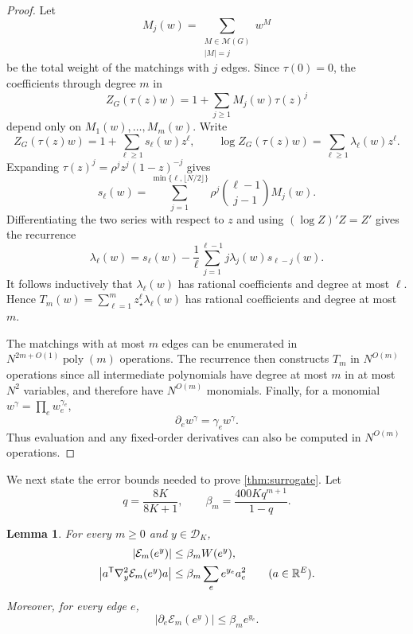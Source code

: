 \documentclass[11pt,reqno,letterpaper]{amsart}
\numberwithin{equation}{section}
\newtheorem{lemma}[lemma]{Lemma}
\theoremstyle{definition}
\theoremstyle{remark}
\newcommand{\R}{\mathbb R}
\newcommand{\cM}{\mathcal M}
\newcommand{\cD}{\mathcal D}
\begin{document}
\begin{proof}
Let
\[
 M_j(w)=\sum_{\substack{M\in\cM(G)\\|M|=j}}w^M
\]
be the total weight of the matchings with $j$ edges. Since $\tau(0)=0$,
the coefficients through degree $m$ in
\[
 Z_G(\tau(z)w)=1+\sum_{j\ge1}M_j(w)\tau(z)^j
\]
depend only on $M_1(w),\ldots,M_m(w)$. Write
\[
 Z_G(\tau(z)w)=1+\sum_{\ell\ge1}s_\ell(w)z^\ell,
 \qquad
 \log Z_G(\tau(z)w)=\sum_{\ell\ge1}\lambda_\ell(w)z^\ell.
\]
Expanding $\tau(z)^j=\rho^jz^j(1-z)^{-j}$ gives
\[
 s_\ell(w)=
 \sum_{j=1}^{\min\{\ell,\lfloor N/2\rfloor\}}
 \rho^j\binom{\ell-1}{j-1}M_j(w).
\]
Differentiating the two series with respect to $z$ and using
$(\log Z)'Z=Z'$ gives the recurrence
\begin{equation}\label{eq:log-coefficient-recurrence}
 \lambda_\ell(w)
 =s_\ell(w)-\frac1\ell
   \sum_{j=1}^{\ell-1}j\lambda_j(w)s_{\ell-j}(w).
\end{equation}
It follows inductively that $\lambda_\ell(w)$ has rational
coefficients and degree at most $\ell$. Hence
$T_m(w)=\sum_{\ell=1}^m z_\star^\ell\lambda_\ell(w)$ has rational
coefficients and degree at most $m$.

The matchings with at most $m$ edges can be enumerated in
$N^{2m+O(1)}\operatorname{poly}(m)$ operations. The recurrence then
constructs $T_m$ in $N^{O(m)}$ operations since all intermediate
polynomials have degree at most $m$ in at most $N^2$ variables,
and therefore have $N^{O(m)}$ monomials. Finally, for a monomial
$w^\gamma=\prod_e w_e^{\gamma_e}$,
\[
 \partial_e w^\gamma=\gamma_e w^\gamma.
\]
Thus evaluation and any fixed-order derivatives can also be
computed in $N^{O(m)}$ operations.
\end{proof}

We next state the error bounds needed to prove \cref{thm:surrogate}.
Let
\begin{equation*}
 q=\frac{8K}{8K+1},\qquad
 \beta_m=\frac{400Kq^{m+1}}{1-q}.
\end{equation*}

\begin{lemma}\label{lem:taylor-error-bounds}
For every $m\ge0$ and $y\in\cD_K$,
\begin{align}
 |\mathcal E_m(e^y)|
 &\le \beta_mW(e^y),\label{eq:taylor-value-error}\\
 \left|a^{\mathsf T}\nabla_y^2\mathcal E_m(e^y)a\right|
 &\le\beta_m\sum_e e^{y_e}a_e^2
 \qquad(a\in\R^E).\notag
\end{align}
Moreover, for every edge $e$,
\begin{equation}\label{eq:taylor-gradient-error}
 |\partial_e\mathcal E_m(e^y)|\le \beta_m e^{y_e}.
\end{equation}
\end{lemma}
\end{document}
